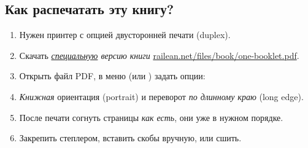 \documentclass[a5paper,11pt]{memoir}
\begin{document}
{%

\subsection{Как распечатать эту книгу?}


\begin{enumerate}
	\item Нужен принтер с опцией двусторонней печати (duplex).
	\item Скачать \emph{\underline{специальную} версию книги} \href{https://railean.net/files/book/one-booklet.pdf}{ railean.net/files/book/one-booklet.pdf}.
	\item Открыть файл PDF, в меню  (или ) задать опции:
	\item \emph{Книжная} ориентация (portrait) и переворот \emph{по длинному краю} (long edge).
	\item После печати согнуть %
	страницы \emph{как есть}, они уже в нужном порядке.
	\item Закрепить степлером, вставить скобы вручную, или сшить.
\end{enumerate}




}
\newpage

\addto\captionsrussian{ 
}
\begin{KeepFromToc}
  \tableofcontents
\end{KeepFromToc}
\end{document}
